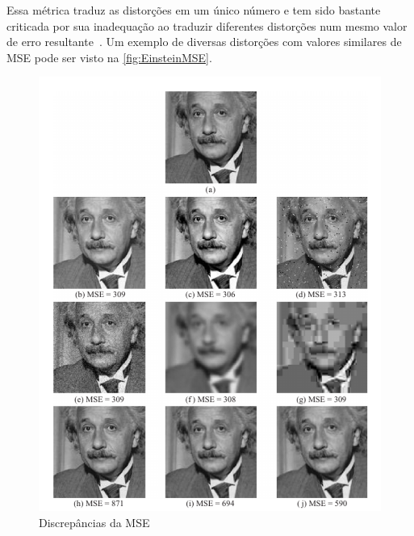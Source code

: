 Essa métrica traduz as distorções em um único número e tem sido bastante criticada por sua inadequação ao traduzir diferentes distorções num mesmo valor de erro resultante~\cite{leaveItBovik}. Um exemplo de diversas distorções com valores similares de MSE pode ser visto na \autoref{fig:EinsteinMSE}.

\begin{figure}[htb]
	\centering
	\begin{minipage}{.8\textwidth}
		\caption{Discrepâncias da MSE}\label{fig:EinsteinMSE}
		\centerline{\includegraphics[width=\textwidth]{../img/EinsteinMSE.pdf}}
	\end{minipage}
\end{figure}

